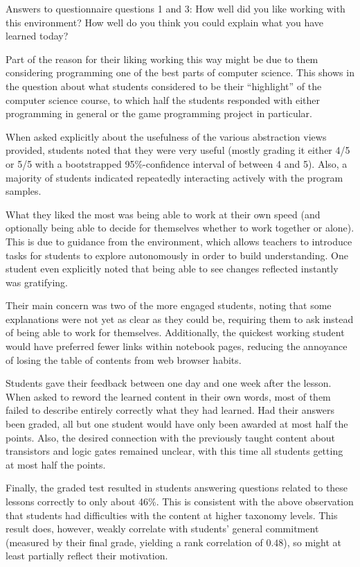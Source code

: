 \begin{cfigure}{Answers to questionnaire questions 1 and 3: How well did you like working with this environment? How well do you think you could explain what you have learned today?}

\end{cfigure}

Part of the reason for their liking working this way might be due to them considering programming one of the best parts of computer science. This shows in the question about what students considered to be their ``highlight'' of the computer science course, to which half the students responded with either programming in general or the game programming project in particular.

When asked explicitly about the usefulness of the various abstraction views provided, students noted that they were very useful (mostly grading it either 4/5 or 5/5 with a bootstrapped 95\%-confidence interval of between 4 and 5). Also, a majority of students indicated repeatedly interacting actively with the program samples.

What they liked the most was being able to work at their own speed (and optionally being able to decide for themselves whether to work together or alone). This is due to guidance from the environment, which allows teachers to introduce tasks for students to explore autonomously in order to build understanding. One student even explicitly noted that being able to see changes reflected instantly was gratifying.

Their main concern was two of the more engaged students, noting that some explanations were not yet as clear as they could be, requiring them to ask instead of being able to work for themselves. Additionally, the quickest working student would have preferred fewer links within notebook pages, reducing the annoyance of losing the table of contents from web browser habits.

Students gave their feedback between one day and one week after the lesson. When asked to reword the learned content in their own words, most of them failed to describe entirely correctly what they had learned. Had their answers been graded, all but one student would have only been awarded at most half the points. Also, the desired connection with the previously taught content about transistors and logic gates remained unclear, with this time all students getting at most half the points.

Finally, the graded test resulted in students answering questions related to these lessons correctly to only about 46\%. This is consistent with the above observation that students had difficulties with the content at higher taxonomy levels. This result does, however, weakly correlate with students' general commitment (measured by their final grade, yielding a rank correlation of $0.48$), so might at least partially reflect their motivation.


